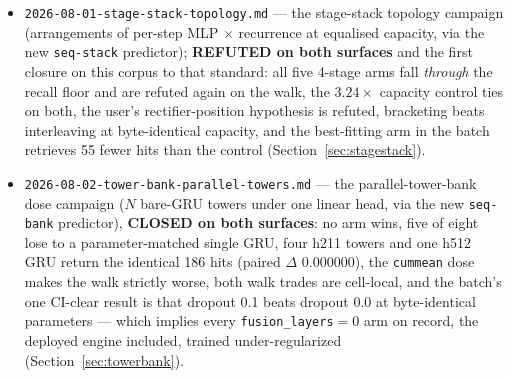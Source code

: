 \documentclass[11pt]{article}
\begin{document}
\begin{itemize}
    \texttt{walk\_dualgru.py}, \texttt{walk\_headtohead.py}), whose module
    docstrings are the authority for how each metric is computed; that material
    has no campaign report of its own yet.
  \item \texttt{2026-08-01-stage-stack-topology.md} --- the stage-stack
    topology campaign (arrangements of per-step MLP $\times$ recurrence at
    equalised capacity, via the new \texttt{seq-stack} predictor);
    \textbf{REFUTED on both surfaces} and the first closure on this corpus to that
    standard: all five 4-stage arms fall \emph{through} the recall floor and are
    refuted again on the walk, the $\num{3.24}\times$ capacity control ties on
    both, the user's rectifier-position hypothesis is refuted, bracketing beats
    interleaving at byte-identical capacity, and the best-fitting arm in the batch
    retrieves \num{55} fewer hits than the control
    (Section~\ref{sec:stagestack}).
  \item \texttt{2026-08-02-tower-bank-parallel-towers.md} --- the
    parallel-tower-bank dose campaign ($N$ bare-GRU towers under one linear head,
    via the new \texttt{seq-bank} predictor), \textbf{CLOSED on both surfaces}:
    no arm wins, five of eight lose to a parameter-matched single GRU, four h211
    towers and one h512 GRU return the identical \num{186} hits (paired $\Delta$
    \num{0.000000}), the \texttt{cummean} dose makes the walk strictly worse,
    both walk trades are cell-local, and the batch's one CI-clear result is that
    dropout \num{0.1} beats dropout \num{0.0} at byte-identical parameters ---
    which implies every \texttt{fusion\_layers}${}=0$ arm on record, the deployed
    engine included, trained under-regularized (Section~\ref{sec:towerbank}).
\end{itemize}
\end{document}
